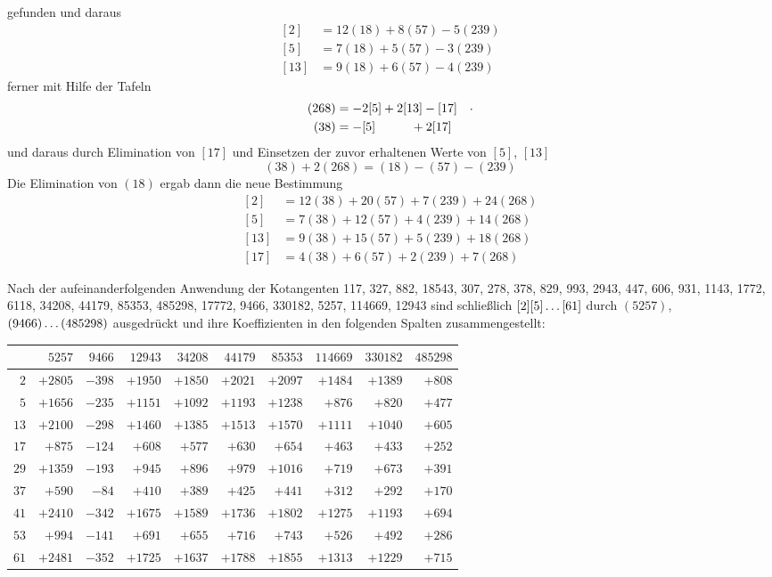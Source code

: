 gefunden und daraus
\[
\begin{aligned}
{}[2]&=12(18)+8(57)-5(239)\\
{}[5]&=7(18)+5(57)-3(239)\\
{}[13]&=9(18)+6(57)-4(239)
\end{aligned}
\]
ferner mit Hilfe der Tafeln
\[
\begin{aligned}
(268)&=-2[5]+2[13]-[17]\quad\raisebox{.4ex}{$\pdot$}\\
(38)&=-[5]\phantom{+2[13]}+2[17]
\end{aligned}
\]
und daraus durch Elimination von $[17]$ und Einsetzen der zuvor erhaltenen Werte von $[5]$, $[13]$
\[
(38)+2(268)=(18)-(57)-(239)
\]
Die Elimination von $(18)$ ergab dann die neue Bestimmung
\[
\begin{aligned}
{}[2]&=12(38)+20(57)+7(239)+24(268)\\
{}[5]&=7(38)+12(57)+4(239)+14(268)\\
{}[13]&=9(38)+15(57)+5(239)+18(268)\\
{}[17]&=4(38)+6(57)+2(239)+7(268)
\end{aligned}
\]
\par Nach der aufeinanderfolgenden Anwendung der Kotangenten 117, 327, 882, 18543, 307, 278, 378, 829, 993, 2943, 447, 606, 931, 1143, 1772, 6118, 34208, 44179, 85353, 485298, 17772, 9466, 330182, 5257, 114669, 12943 sind schließlich $[2][5]\mathinner{.\,.\,.}[61]$ durch $(5257)$, $(9466)\mathinner{.\,.\,.}(485298)$ ausgedrückt und ihre Koeffizienten in den folgenden Spalten zusammengestellt:
\begingroup\fontsize{9.5}{12}\selectfont\setlength{\tabcolsep}{2.3pt}
\begin{center}
\begin{tabular}{r|r|r|r|r|r|r|r|r|r}
 & $5257$ & $9466$ & $12943$ & $34208$ & $44179$ & $85353$ & $114669$ & $330182$ & $485298$ \\\hline
$2$ & $+2805$ & $-398$ & $+1950$ & $+1850$ & $+2021$ & $+2097$ & $+1484$ & $+1389$ & $+808$ \\
$5$ & $+1656$ & $-235$ & $+1151$ & $+1092$ & $+1193$ & $+1238$ & $+876$ & $+820$ & $+477$ \\
$13$ & $+2100$ & $-298$ & $+1460$ & $+1385$ & $+1513$ & $+1570$ & $+1111$ & $+1040$ & $+605$ \\
$17$ & $+875$ & $-124$ & $+608$ & $+577$ & $+630$ & $+654$ & $+463$ & $+433$ & $+252$ \\
$29$ & $+1359$ & $-193$ & $+945$ & $+896$ & $+979$ & $+1016$ & $+719$ & $+673$ & $+391$ \\
$37$ & $+590$ & $-84$ & $+410$ & $+389$ & $+425$ & $+441$ & $+312$ & $+292$ & $+170$ \\
$41$ & $+2410$ & $-342$ & $+1675$ & $+1589$ & $+1736$ & $+1802$ & $+1275$ & $+1193$ & $+694$ \\
$53$ & $+994$ & $-141$ & $+691$ & $+655$ & $+716$ & $+743$ & $+526$ & $+492$ & $+286$ \\
$61$ & $+2481$ & $-352$ & $+1725$ & $+1637$ & $+1788$ & $+1855$ & $+1313$ & $+1229$ & $+715$ \\
\end{tabular}
\end{center}\endgroup
